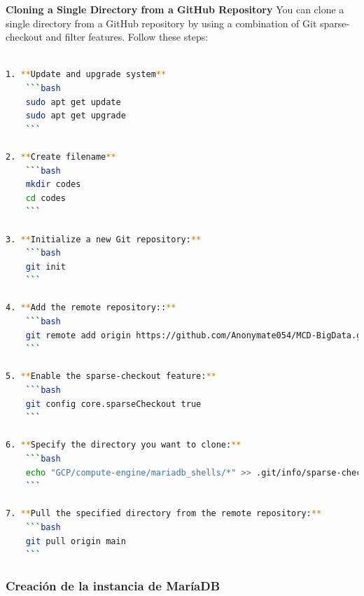\documentclass{article}
\begin{document}
\textbf{Cloning a Single Directory from a GitHub Repository}
You can clone a single directory from a GitHub repository by using a combination of Git sparse-checkout and filter features. Follow these steps:

\begin{lstlisting}[language=bash,caption={bash version}]

1. **Update and upgrade system**
    ```bash
    sudo apt get update
    sudo apt get upgrade
    ```

2. **Create filename**
    ```bash
    mkdir codes
    cd codes
    ```

3. **Initialize a new Git repository:**
    ```bash
    git init
    ```

4. **Add the remote repository::**
    ```bash
    git remote add origin https://github.com/Anonymate054/MCD-BigData.git
    ```

5. **Enable the sparse-checkout feature:**
    ```bash
    git config core.sparseCheckout true
    ```

6. **Specify the directory you want to clone:**
    ```bash
    echo "GCP/compute-engine/mariadb_shells/*" >> .git/info/sparse-checkout
    ```

7. **Pull the specified directory from the remote repository:**
    ```bash
    git pull origin main
    ```
\end{lstlisting}

\subsubsection{Creación de la instancia de MaríaDB}
\end{document}
